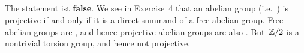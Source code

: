 \subsection{}

The statement ist \textbf{false}.
We see in Exercise~4 that an abelian group (i.e.~{\module{$\Integer$}}) is projective if and only if it is a direct summand of a free abelian group.
Free abelian groups are , and hence projective abelian groups are also . But~$\mathbb{Z}/2$ is a nontrivial torsion group, and hence not projective.



